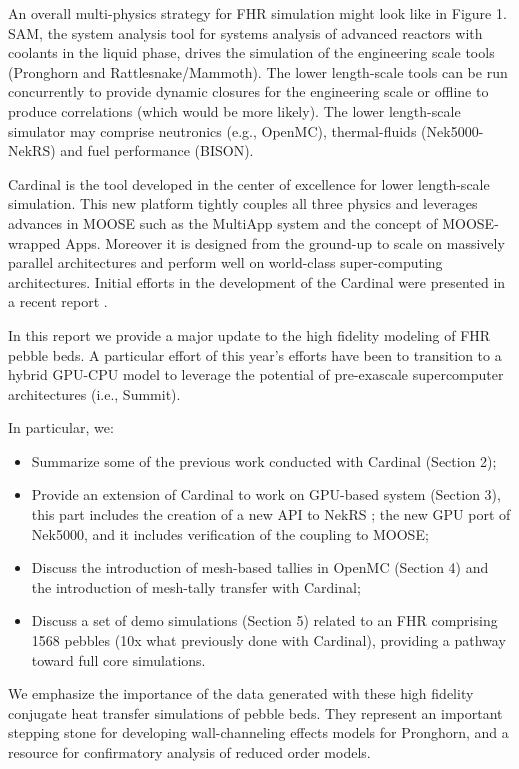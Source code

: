 An overall multi-physics strategy for FHR simulation might look like in Figure 1. SAM, the system analysis tool for systems analysis of advanced reactors with coolants in the liquid phase, drives the simulation of the engineering scale tools (Pronghorn and Rattlesnake/Mammoth). The lower length-scale tools can be run concurrently to provide dynamic closures for the engineering scale or offline to produce correlations (which would be more likely). The lower length-scale simulator may comprise neutronics (e.g., OpenMC), thermal-fluids (Nek5000-NekRS) and fuel performance (BISON).

Cardinal is the tool developed in the center of excellence for lower length-scale simulation. This new platform tightly couples all three physics and leverages advances in MOOSE \cite{gaston2009moose} such as the MultiApp system and the concept of MOOSE-wrapped Apps. Moreover it is designed from the ground-up to scale on massively parallel architectures and perform well on world-class super-computing architectures. Initial efforts in the development of the Cardinal were presented in a recent report \cite{cardinal}.

In this report we provide a major update to the high fidelity modeling of FHR pebble beds. A particular effort of this year's efforts have been to transition to a hybrid GPU-CPU model to leverage the potential of pre-exascale supercomputer architectures (i.e., Summit).

In particular, we:
\begin{itemize}
\item Summarize some of the previous work conducted with Cardinal (Section 2);
\item Provide an extension of Cardinal to work on GPU-based system (Section 3), this part includes the creation of a new API to NekRS \cite{toward}; the new GPU port of Nek5000, and it includes  verification of the coupling to MOOSE;
\item Discuss the introduction of mesh-based tallies in OpenMC (Section 4) and the introduction of mesh-tally transfer with Cardinal;
\item Discuss a set of demo simulations (Section 5) related to an FHR comprising 1568 pebbles (10x what previously done with Cardinal), providing a pathway toward full core simulations.
\end{itemize}

We emphasize the importance of the data generated with these high fidelity conjugate heat transfer simulations of pebble beds. They represent an important stepping stone for developing wall-channeling effects models for Pronghorn, and a resource for confirmatory analysis of reduced order models.
